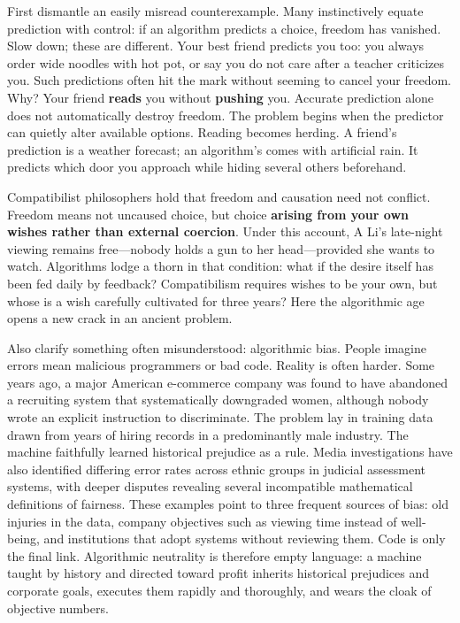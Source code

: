 First dismantle an easily misread counterexample. Many instinctively equate prediction with control: if an algorithm predicts a choice, freedom has vanished. Slow down; these are different. Your best friend predicts you too: you always order wide noodles with hot pot, or say you do not care after a teacher criticizes you. Such predictions often hit the mark without seeming to cancel your freedom. Why? Your friend \textbf{reads} you without \textbf{pushing} you. Accurate prediction alone does not automatically destroy freedom. The problem begins when the predictor can quietly alter available options. Reading becomes herding. A friend's prediction is a weather forecast; an algorithm's comes with artificial rain. It predicts which door you approach while hiding several others beforehand.

Compatibilist philosophers hold that freedom and causation need not conflict. Freedom means not uncaused choice, but choice \textbf{arising from your own wishes rather than external coercion}. Under this account, A Li's late-night viewing remains free---nobody holds a gun to her head---provided she wants to watch. Algorithms lodge a thorn in that condition: what if the desire itself has been fed daily by feedback? Compatibilism requires wishes to be your own, but whose is a wish carefully cultivated for three years? Here the algorithmic age opens a new crack in an ancient problem.

Also clarify something often misunderstood: algorithmic bias. People imagine errors mean malicious programmers or bad code. Reality is often harder. Some years ago, a major American e-commerce company was found to have abandoned a recruiting system that systematically downgraded women, although nobody wrote an explicit instruction to discriminate. The problem lay in training data drawn from years of hiring records in a predominantly male industry. The machine faithfully learned historical prejudice as a rule. Media investigations have also identified differing error rates across ethnic groups in judicial assessment systems, with deeper disputes revealing several incompatible mathematical definitions of fairness. These examples point to three frequent sources of bias: old injuries in the data, company objectives such as viewing time instead of well-being, and institutions that adopt systems without reviewing them. Code is only the final link. Algorithmic neutrality is therefore empty language: a machine taught by history and directed toward profit inherits historical prejudices and corporate goals, executes them rapidly and thoroughly, and wears the cloak of objective numbers.

